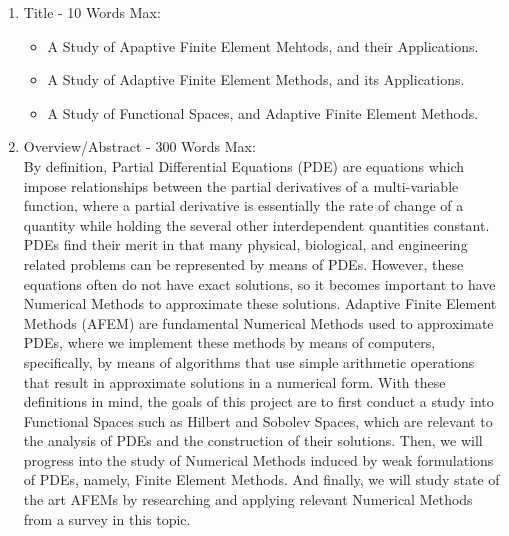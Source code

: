 \documentclass[11pt]{article}
\begin{document}
\pagestyle{fancy}
\fancyhead{}
\fancyhead[L]{\textbf{\rightmark}}

\begin{enumerate}

\item Title - 10 Words Max:
\begin{itemize}
\item A Study of Apaptive Finite Element Mehtods, and their Applications.
\item A Study of Adaptive Finite Element Methods, and its Applications.
\item A Study of Functional Spaces, and Adaptive Finite Element Methods.
\end{itemize}

\item Overview/Abstract - 300 Words Max: \\
By definition, Partial Differential Equations (PDE) are equations which impose relationships
between the partial derivatives of a multi-variable function, where a partial derivative is
essentially the rate of change of a quantity while holding the several other interdependent quantities constant.
PDEs find their merit in that many physical, biological, and engineering related problems can be represented by means of PDEs.
However, these equations often do not have exact solutions, so it becomes important to have Numerical Methods to approximate these solutions.
Adaptive Finite Element Methods (AFEM)
are fundamental Numerical Methods used to approximate PDEs, where we implement these methods by means of computers, specifically, by means
of algorithms that use simple arithmetic operations that result in approximate solutions in a numerical form.
With these definitions in mind, the goals of this project are to first conduct a study into Functional Spaces such as
Hilbert and Sobolev Spaces, which are relevant to the analysis of PDEs and the construction of their solutions.
Then, we will progress into the study of Numerical Methods induced by weak formulations
of PDEs, namely, Finite Element Methods. And finally, we will study state of the art AFEMs
by researching and applying relevant Numerical Methods from a survey in this topic.


\end{enumerate}
\end{document}
